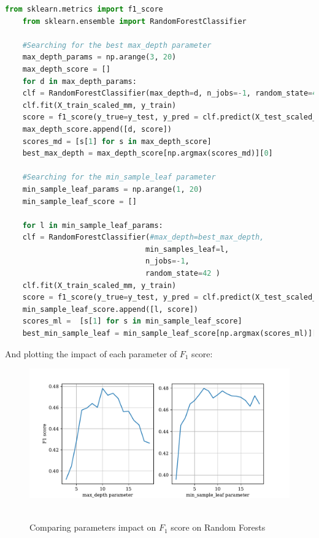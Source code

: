 \begin{lstlisting}[language=Python, caption= Searching for the best parameters for a random forest classifier]
    from sklearn.metrics import f1_score
    from sklearn.ensemble import RandomForestClassifier

    #Searching for the best max_depth parameter
    max_depth_params = np.arange(3, 20)
    max_depth_score = []
    for d in max_depth_params:
    clf = RandomForestClassifier(max_depth=d, n_jobs=-1, random_state=42)
    clf.fit(X_train_scaled_mm, y_train)
    score = f1_score(y_true=y_test, y_pred = clf.predict(X_test_scaled_mm))
    max_depth_score.append([d, score])
    scores_md = [s[1] for s in max_depth_score]
    best_max_depth = max_depth_score[np.argmax(scores_md)][0]

    #Searching for the min_sample_leaf parameter
    min_sample_leaf_params = np.arange(1, 20)
    min_sample_leaf_score = []

    for l in min_sample_leaf_params:
    clf = RandomForestClassifier(#max_depth=best_max_depth,
                                min_samples_leaf=l,
                                n_jobs=-1,
                                random_state=42 )
    clf.fit(X_train_scaled_mm, y_train)
    score = f1_score(y_true=y_test, y_pred = clf.predict(X_test_scaled_mm))
    min_sample_leaf_score.append([l, score])
    scores_ml =  [s[1] for s in min_sample_leaf_score]
    best_min_sample_leaf = min_sample_leaf_score[np.argmax(scores_ml)][0]
\end{lstlisting}

And plotting the impact of each parameter of \(F_1\) score:

\begin{figure}[htb]
    \centering
    \includegraphics[scale=0.7]{pictures/random_forest_score.pdf}\
    \caption{Comparing parameters impact on \(F_1\) score on Random Forests}
    \label{fig_random_forest_score}
\end{figure}

